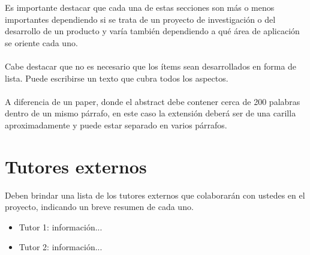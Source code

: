 \documentclass[a4paper,10pt]{article}
\begin{document}
Es importante destacar que cada una de estas secciones son más o menos importantes dependiendo si se trata de un proyecto de investigación o del desarrollo de un producto y varía también dependiendo a qué área de aplicación se oriente cada uno.
\paragraph{}
Cabe destacar que no es necesario que los ítems sean desarrollados en forma de lista. Puede escribirse un texto que cubra todos los aspectos.
\paragraph{}
A diferencia de un paper, donde el abstract debe contener cerca de 200 palabras dentro de un mismo párrafo, en este caso la extensión deberá ser de una carilla aproximadamente y puede estar separado en varios párrafos. \cite{MendeleySupportTeam2011MendeleyGuide}

\newpage
\section{Tutores externos}
\label{sec:tutores}
Deben brindar una lista de los tutores externos que colaborarán con ustedes en el proyecto, indicando un breve resumen de cada uno.

\begin{itemize}
	\item Tutor 1: información...
    \item Tutor 2: información...
\end{itemize}


\printbibliography
\end{document}
